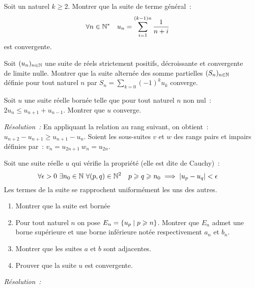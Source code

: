 \begin{exercice}
    Soit un naturel \(k \geqslant 2\). Montrer que la suite de terme général~:
    \[ \forall n \in \mathbb{N}^* \quad u_n = \sum_{i=1}^{(k-1)n} \frac{1}{n+i} \]
    est convergente.
\end{exercice}
\begin{exercice}
    Soit \((u_n)_{n \in \mathbb{N}}\) une suite de réels strictement positifs, décroissante et convergente de limite nulle. Montrer que la suite alternée des somme partielles \((S_n)_{n\in\mathbb{N}}\) définie pour tout naturel \(n\) par \(S_n = \sum_{k=0} (-1)^k u_k\) converge.
\end{exercice}
\begin{exercice}
    Soit \(u\) une suite réelle bornée telle que pour tout naturel \(n\) non nul~: \(2u_n \leqslant u_{n+1} + u_{n-1} \). Montrer que \(u\) converge.
\end{exercice}
\emph{Résolution~:}
En appliquant la relation au rang suivant, on obtient~: \(u_{n+2} - u_{n+1} \geqslant u_{n+1} - u_n\). Soient les sous-suites \(v\) et \(w\) des rangs pairs et impairs définies par~: \(v_n = u_{2n+1} \ w_n = u_{2n}\).
\begin{exercice}
    Soit une suite réelle \(u\) qui vérifie la propriété (elle est dite de Cauchy)~:
    \[ \forall \epsilon > 0 \ \exists n_0 \in \N \ \forall (p,q) \in \N^2 \quad p \geqslant q \geqslant n_0 \implies \abs{u_p-u_q} < \epsilon \]
    Les termes de la suite se rapprochent uniformément les uns des autres.
    \begin{enumerate}
        \item Montrer que la suite est bornée
        \item Pour tout naturel \(n\) on pose \(E_n = \left\{u_p\mathrel{}\middle|\mathrel{}p\geqslant n\right\}\). Montrer que \(E_n\) admet une borne supérieure et une borne inférieure notée respectivement \(a_n\) et \(b_n\).
        \item Montrer que les suites \(a\) et \(b\) sont adjacentes.
        \item Prouver que la suite \(u\) est convergente.
    \end{enumerate}
\end{exercice}
\emph{Résolution~:}
